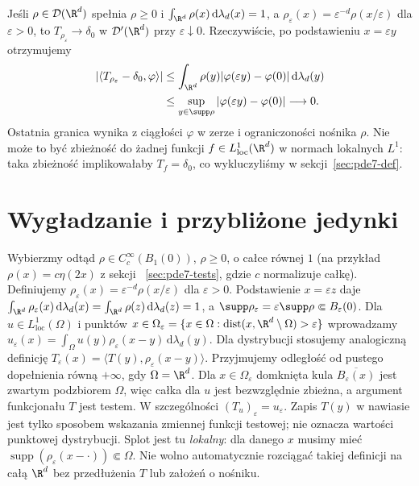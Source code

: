 \begin{przyklad}
Jeśli $\rho\in\mathcal D(\R^d)$ spełnia $\rho\ge0$ i
$\int_{\R^d}\rho(x)\,\mathrm d\lambda_d(x)=1$, a
$\rho_\varepsilon(x)=\varepsilon^{-d}\rho(x/\varepsilon)$
dla $\varepsilon>0$, to
$T_{\rho_\varepsilon}\to\delta_0$ w $\mathcal D'(\R^d)$
przy $\varepsilon\downarrow0$.
Rzeczywiście, po podstawieniu $x=\varepsilon y$
otrzymujemy
\[
 \begin{aligned}
 |\langle T_{\rho_\varepsilon}-\delta_0,\varphi\rangle|
 &\le \int_{\R^d}\rho(y)
 |\varphi(\varepsilon y)-\varphi(0)|\,\mathrm d\lambda_d(y)\\
 &\le\sup_{y\in\supp\rho}
 |\varphi(\varepsilon y)-\varphi(0)|
 \longrightarrow0.
 \end{aligned}
\]
Ostatnia granica wynika z ciągłości $\varphi$ w zerze
i ograniczoności nośnika $\rho$.
Nie może to być zbieżność do żadnej funkcji
$f\in L^1_{\mathrm{loc}}(\R^d)$ w normach lokalnych $L^1$:
taka zbieżność implikowałaby $T_f=\delta_0$,
co wykluczyliśmy w sekcji~\ref{sec:pde7-def}.
\end{przyklad}

\section{Wygładzanie i przybliżone jedynki}
\label{sec:pde7-mollifiers}

Wybierzmy odtąd $\rho\in C_c^\infty(B_1(0))$,
$\rho\ge0$, o całce równej $1$
(na przykład $\rho(x)=c\eta(2x)$ z sekcji
~\ref{sec:pde7-tests}, gdzie $c$ normalizuje całkę).
Definiujemy
$\rho_\varepsilon(x)=\varepsilon^{-d}\rho(x/\varepsilon)$
dla $\varepsilon>0$. Podstawienie $x=\varepsilon z$
daje
$\int_{\R^d}\rho_\varepsilon(x)\,\mathrm d\lambda_d(x)
=\int_{\R^d}\rho(z)\,\mathrm d\lambda_d(z)=1$,
a $\supp\rho_\varepsilon=\varepsilon\supp\rho
\Subset B_\varepsilon(0)$.
Dla $u\in L^1_{\mathrm{loc}}(\Omega)$ i punktów
$x\in\Omega_\varepsilon
=\{x\in\Omega:\operatorname{dist}(x,\R^d\setminus\Omega)>\varepsilon\}$
wprowadzamy
$u_\varepsilon(x)=\int_\Omega u(y)\rho_\varepsilon(x-y)
\,\mathrm d\lambda_d(y)$. Dla dystrybucji stosujemy analogiczną
definicję $T_\varepsilon(x)=\langle T(y),\rho_\varepsilon(x-y)\rangle$.
Przyjmujemy odległość od pustego dopełnienia
równą $+\infty$, gdy $\Omega=\R^d$.
Dla $x\in\Omega_\varepsilon$ domknięta kula
$\overline{B_\varepsilon(x)}$ jest zwartym podzbiorem
$\Omega$, więc całka dla $u$ jest bezwzględnie
zbieżna, a argument funkcjonału $T$ jest testem.
W szczególności $(T_u)_\varepsilon=u_\varepsilon$.
Zapis $T(y)$ w nawiasie jest tylko sposobem wskazania zmiennej
funkcji testowej; nie oznacza wartości punktowej dystrybucji.
Splot jest tu \emph{lokalny}: dla danego $x$ musimy mieć
$\operatorname{supp}(\rho_\varepsilon(x-\cdot))\Subset\Omega$.
Nie wolno automatycznie rozciągać takiej definicji na całą
$\R^d$ bez przedłużenia $T$ lub założeń o nośniku.

